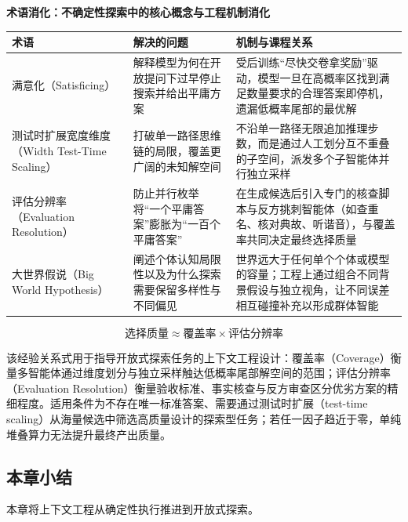 \documentclass[UTF8,a4paper,11pt,fontset=fandol]{ctexart}
\begin{document}
\par{}\textbf{术语消化：不确定性探索中的核心概念与工程机制消化}

\begin{center}\small\begin{tabularx}{\linewidth}{YYY}

\toprule

术语 & 解决的问题 & 机制与课程关系\\\midrule

满意化（Satisficing） & 解释模型为何在开放提问下过早停止搜索并给出平庸方案 & 受后训练“尽快交卷拿奖励”驱动，模型一旦在高概率区找到满足数量要求的合理答案即停机，遗漏低概率尾部的最优解\\[3pt]

测试时扩展宽度维度（Width Test-Time Scaling） & 打破单一路径思维链的局限，覆盖更广阔的未知解空间 & 不沿单一路径无限追加推理步数，而是通过人工划分互不重叠的子空间，派发多个子智能体并行独立采样\\[3pt]

评估分辨率（Evaluation Resolution） & 防止并行枚举将“一个平庸答案”膨胀为“一百个平庸答案” & 在生成候选后引入专门的核查脚本与反方挑刺智能体（如查重名、核对典故、听谐音），与覆盖率共同决定最终选择质量\\[3pt]

大世界假说（Big World Hypothesis） & 阐述个体认知局限性以及为什么探索需要保留多样性与不同偏见 & 世界远大于任何单个个体或模型的容量；工程上通过组合不同背景假设与独立视角，让不同误差相互碰撞补充以形成群体智能\\[3pt]

\bottomrule\end{tabularx}\end{center}

\[
\text{选择质量} \approx \text{覆盖率} \times \text{评估分辨率}
\]

该经验关系式用于指导开放式探索任务的上下文工程设计：覆盖率（Coverage）衡量多智能体通过维度划分与独立采样触达低概率尾部解空间的范围；评估分辨率（Evaluation Resolution）衡量验收标准、事实核查与反方审查区分优劣方案的精细程度。适用条件为不存在唯一标准答案、需要通过测试时扩展（test-time scaling）从海量候选中筛选高质量设计的探索型任务；若任一因子趋近于零，单纯堆叠算力无法提升最终产出质量。

\subsection{本章小结}

本章将上下文工程从确定性执行推进到开放式探索。
\end{document}

